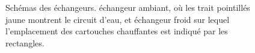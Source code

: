 \begin{figure}[!ht]
    \centering
	\begin{subfigure}[c]{.47\textwidth}
		\centering
		\caption{}
		\label{fig:AHXschema}
	\end{subfigure}		
	\begin{subfigure}[c]{.47\textwidth}
		\centering
		\caption{}
		\label{fig:CHXschema}
	\end{subfigure}	    
    \caption{Schémas des échangeurs.  échangeur ambiant, où les trait pointillés jaune montrent le circuit d'eau, et  échangeur froid sur lequel l'emplacement des cartouches chauffantes est indiqué par les rectangles. }
    \label{fig:HXschema}
\end{figure}

